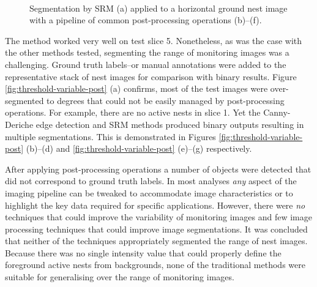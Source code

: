 \begin{figure}[!htbp]
 \\
\caption[Segmentation by region merging.]{Segmentation by SRM (a) applied to a horizontal ground nest image with a pipeline of common post-processing operations (b)--(f).\label{fig:segment-by-region}}
\end{figure}

The method worked very well on test slice 5. Nonetheless, as was the case with the other methods tested, segmenting the range of monitoring images was a challenging. Ground truth labels--or manual annotations were added to the representative stack of nest images for comparison with binary results. Figure \ref{fig:threshold-variable-post} (a) confirms, most of the test images were over-segmented to degrees that could not be easily managed by post-processing operations. For example, there are no active nests in slice 1. Yet the Canny-Deriche edge detection and SRM methods produced binary outputs resulting in multiple segmentations. This is demonstrated in Figures \ref{fig:threshold-variable-post} (b)--(d) and  \ref{fig:threshold-variable-post} (e)--(g) respectively.

After applying post-processing operations a number of objects were detected that did not correspond to ground truth labels. In most analyses \emph{any} aspect of the imaging pipeline can be tweaked to accommodate image characteristics or to highlight the key data required for specific applications. However, there were \emph{no} techniques that could improve the variability of monitoring images and few image processing techniques that could improve image segmentations. It was concluded that neither of the techniques appropriately segmented the range of nest images. Because there was no single intensity value that could properly define the foreground active nests from backgrounds, none of the traditional methods were suitable for generalising over the range of monitoring images.

